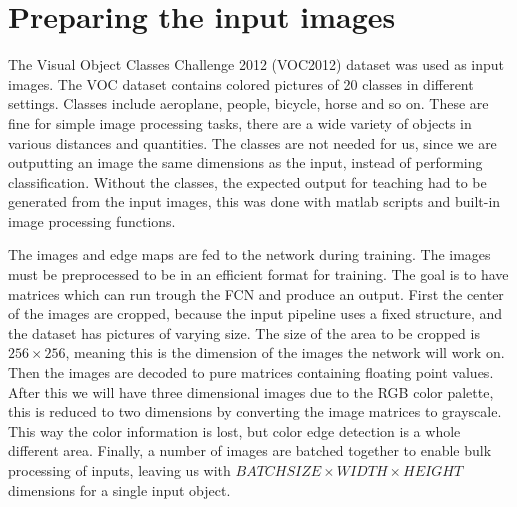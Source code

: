 \documentclass[12pt]{report}
\begin{document}
\section{Preparing the input images}
The Visual Object Classes Challenge 2012 (VOC2012) dataset was used as input images. The VOC dataset contains colored pictures of 20 classes in different settings. Classes include aeroplane, people, bicycle, horse and so on. These are fine for simple image processing tasks, there are a wide variety of objects in various distances and quantities. The classes are not needed for us, since we are outputting an image the same dimensions as the input, instead of performing classification. Without the classes, the expected output for teaching had to be generated from the input images, this was done with matlab scripts and built-in image processing functions.\par
The images and edge maps are fed to the network during training. The images must be preprocessed to be in an efficient format for training. The goal is to have matrices which can run trough the FCN and produce an output. First the center of the images are cropped, because the input pipeline uses a fixed structure, and the dataset has pictures of varying size. The size of the area to be cropped is $256×256$, meaning this is the dimension of the images the network will work on. Then the images are decoded to pure matrices containing floating point values. After this we will have three dimensional images due to the RGB color palette, this is reduced to two dimensions by converting the image matrices to grayscale. This way the color information is lost, but color edge detection is a whole different area. Finally, a number of images are batched together to enable bulk processing of inputs, leaving us with $ BATCH SIZE × WIDTH × HEIGHT $ dimensions for a single input object.
\end{document}

